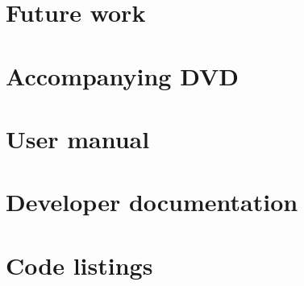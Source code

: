 \documentclass[a4paper,12pt]{report}
\begin{document}
\clearpage
\clearpage
\clearpage


\chapter{Future work}



\newpage


\newpage
\appendix

\chapter{Accompanying DVD}


\chapter{User manual}


\chapter{Developer documentation}


\chapter{Code listings}

\end{document}
